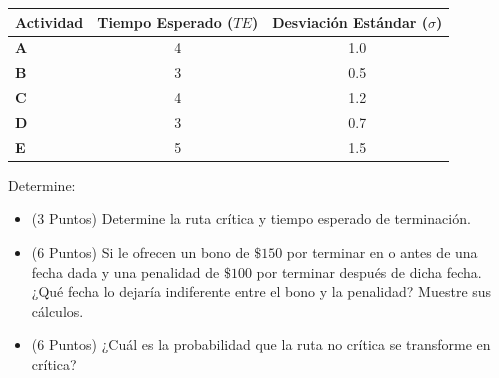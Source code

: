 \documentclass[11pt, a4paper]{article}
\begin{document}
  \begin{center}
  \small
  \begin{tabular}{lcc}
    \toprule
    \textbf{Actividad} & \textbf{Tiempo Esperado ($TE$)} & \textbf{Desviación Estándar ($\sigma$)} \\
    \midrule
    \textbf{A} & 4 & 1.0 \\
    \textbf{B} & 3 & 0.5 \\
    \textbf{C} & 4 & 1.2 \\
    \textbf{D} & 3 & 0.7 \\
    \textbf{E} & 5 & 1.5 \\
    \bottomrule
  \end{tabular}
  \end{center}

  Determine:
  \begin{itemize}
    \item[\textbf{a)}] (3 Puntos) Determine la ruta crítica y tiempo esperado de terminación.
    \item[\textbf{b)}] (6 Puntos) Si le ofrecen un bono de $\$150$ por terminar en o antes de una fecha dada y una penalidad de $\$100$ por terminar después de dicha fecha. ¿Qué fecha lo dejaría indiferente entre el bono y la penalidad? Muestre sus cálculos.
    \item[\textbf{c)}] (6 Puntos) ¿Cuál es la probabilidad que la ruta no crítica se transforme en crítica?
  \end{itemize}
\end{document}
